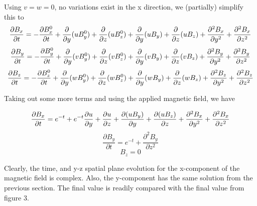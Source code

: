 \documentclass[11pt]{article}
\begin{document}
Using $v=w=0$, no variations exist in the x direction, we (partially) simplify this to
\begin{equation}
	\frac{\partial B_x}{\partial t}
	=
	-\frac{\partial B_x^0}{\partial t}
	+\frac{\partial}{\partial y} (u B_y^0)
	+\frac{\partial}{\partial z} (u B_z^0) \\
	+\frac{\partial}{\partial y} (u B_y)
	+\frac{\partial}{\partial z} (u B_z)
	+\frac{\partial^2 B_x}{\partial y^2}
	+\frac{\partial^2 B_x}{\partial z^2}
\end{equation}
\begin{equation}
	\frac{\partial B_y}{\partial t}
	=
	-\frac{\partial B_y^0}{\partial t}
	+\frac{\partial}{\partial y} (v B_y^0)
	+\frac{\partial}{\partial z} (v B_z^0) \\
	+\frac{\partial}{\partial y} (v B_y)
	+\frac{\partial}{\partial z} (v B_z)
	+\frac{\partial^2 B_y}{\partial y^2}
	+\frac{\partial^2 B_y}{\partial z^2}
\end{equation}
\begin{equation}
	\frac{\partial B_z}{\partial t}
	=
	-\frac{\partial B_z^0}{\partial t}
	+\frac{\partial}{\partial y} (w B_y^0)
	+\frac{\partial}{\partial z} (w B_z^0) \\
	+\frac{\partial}{\partial y} (w B_y)
	+\frac{\partial}{\partial z} (w B_z)
	+\frac{\partial^2 B_z}{\partial y^2}
	+\frac{\partial^2 B_z}{\partial z^2}
\end{equation}

Taking out some more terms and using the applied magnetic field, we have

\begin{equation}
	\frac{\partial B_x}{\partial t}
	=
	e^{-t}
	+e^{-t}\frac{\partial u}{\partial y}
	+\frac{\partial u}{\partial z} \\
	+\frac{\partial (u B_y)}{\partial y}
	+\frac{\partial (u B_z)}{\partial z}
	+\frac{\partial^2 B_x}{\partial y^2}
	+\frac{\partial^2 B_x}{\partial z^2}
\end{equation}
\begin{equation}
	\frac{\partial B_y}{\partial t}
	=
	e^{-t}
	+\frac{\partial^2 B_y}{\partial z^2}
\end{equation}
\begin{equation}
	B_z = 0
\end{equation}


Clearly, the time, and y-z spatial plane evolution for the x-component of the magnetic field is complex. Also, the y-component has the same solution from the previous section. The final value is readily compared with the final value from figure 3.
\end{document}
